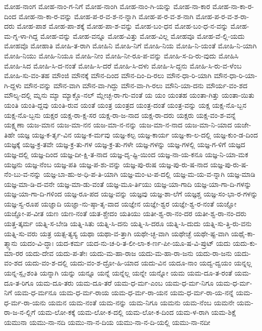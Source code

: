{ಮೋಹ-ನಾಂಗ
ಮೋಹ-ನಾಂ-ಗ-ನಿಗೆ
ಮೋಹ-ನಾಂಗಿ
ಮೋಹ-ನಾಂ-ಗಿ-ಯನ್ನು
ಮೋಹ-ನಾ-ಕಾರ
ಮೋಹ-ನಾ-ಕಾ-ರ-ದಿಂದ
ಮೋಹ-ನಾ-ಕಾ-ರ-ವನ್ನು
ಮೋಹ-ಪ-ರ-ವ-ಶ-ನ-ನ್ನಾಗಿ
ಮೋಹ-ಪ-ರ-ವ-ಶ-ನಾಗಿ
ಮೋಹ-ಪ-ರ-ವ-ಶ-ರಾ-ದರು
ಮೋಹ-ಪಾಶ
ಮೋಹ-ಪಾ-ಶಕ್ಕೆ
ಮೋಹ-ಪಾ-ಶ-ವನ್ನು
ಮೋಹ-ಬಂ-ಧನ
ಮೋಹ-ಬಂ-ಧ-ನ-ವನ್ನು
ಮೋಹ-ಮ-ಗ್ನ-ಳಾ-ಗಿದ್ದ
ಮೋಹ-ವನ್ನು
ಮೋಹ-ವನ್ನೂ
ಮೋಹ-ವಿತ್ತು
ಮೋಹ-ವಿಲ್ಲ
ಮೋಹವೂ
ಮೋಹ-ವೆ-ಲ್ಲಿ-ಯದು
ಮೋಹವೊ
ಮೋಹಾತಿ
ಮೋಹಿ-ತ-ರಾಗಿ
ಮೋಹಿನಿ
ಮೋಹಿ-ನಿಗೆ
ಮೋಹಿ-ನಿಯ
ಮೋಹಿ-ನಿ-ಯಂತೆ
ಮೋಹಿ-ನಿ-ಯಾಗಿ
ಮೋಹಿ-ನಿಯು
ಮೋಹಿ-ನಿಯೂ
ಮೋಹಿ-ನೀಂ
ಮೋಹಿ-ನೀ-ರೂ-ಪ-ವನ್ನು
ಮೋಹಿ-ಸ-ದಿ-ರು-ವುದು
ಮೋಹಿಸಿ
ಮೋಹಿ-ಸಿದ
ಮೋಹಿ-ಸಿ-ದ-ನಂತೆ
ಮೋಹಿ-ಸಿ-ದರೆ
ಮೋಹಿ-ಸಿ-ದಳು
ಮೋಹಿ-ಸಿ-ದ್ದನು
ಮೋಹಿ-ಸಿ-ರು-ವ-ಳೆಂಬ
ಮೋಹಿ-ಸು-ವಂ-ತಹ
ಮೌಂಜಿ
ಮೌನಕ್ಕೆ
ಮೌನ-ದಿಂದ
ಮೌನ-ದಿಂ-ದಿ-ರಲು
ಮೌನ-ಧಾ-ರಿ-ಯಾಗಿ
ಮೌನ-ಧಾ-ರಿ-ಯಾ-ಗಿ-ದ್ದಳು
ಮೌನ-ವನ್ನು
ಮೌನ-ವಾಗಿ
ಮೌನ-ವಾ-ಗಿದ್ದು
ಮೌನ-ವಾ-ಗಿ-ರಲು
ಮೌನಿ-ಯಾ-ದನು
ಮೌರ್ಯ-ವಂ-ಶದ
ಮೌಲ್ಯ-ದಲ್ಲಿ
ಮ್ನನು
ಮ್ಯಾ
ಮ್ಯಾಕ್ಡೊ-ನಲ್
ಮ್ಲೇಚ್ಛ-ರಾ-ಗು-ವಂತೆ
ಯ
ಯಂ
ಯಂತಹ
ಯಂತಾ-ಗಿತ್ತು
ಯಂತಾ-ಯಿತು
ಯಂತಿ
ಯಂತಿ-ದ್ದವು
ಯಂತಿ-ರುವ
ಯಂತೆ
ಯಂತ್ರ
ಯಂತ್ರದ
ಯಂತ್ರ-ದಂತೆ
ಯಂತ್ರ-ವನ್ನು
ಯಕ್ಷ
ಯಕ್ಷ-ನೊ-ಬ್ಬನ
ಯಕ್ಷ-ನೊ-ಬ್ಬನು
ಯಕ್ಷರ
ಯಕ್ಷ-ರಾ-ಕ್ಷ-ಸರ
ಯಕ್ಷ-ರಾ-ಜ-ನಾದ
ಯಕ್ಷ-ರಾ-ದರು
ಯಕ್ಷರು
ಯಕ್ಷ-ವಂ-ಶ-ವನ್ನೆ
ಯಕ್ಷ್ಮಣಾ
ಯಜ-ಮಾನ
ಯಜ-ಮಾ-ನನ
ಯಜ-ಮಾ-ನ-ನನ್ನು
ಯಜ-ಮಾ-ನ-ನಾದ
ಯಜ-ಮಾ-ನಿ-ಯಾದ
ಯಜೇ-ತಿಹೇ
ಯಜ್ಞ
ಯಜ್ಞ-ಕ-ರ್ತೃ-ವಿನ
ಯಜ್ಞ-ಕ-ರ್ಮವು
ಯಜ್ಞ-ಕಲ್ಪ
ಯಜ್ಞ-ಕಾರ್ಯ
ಯಜ್ಞ-ಕಾ-ಲ-ದಲ್ಲಿ
ಯಜ್ಞ-ಕುಂ-ಡ-ದಿಂದ
ಯಜ್ಞಕ್ಕೆ
ಯಜ್ಞ-ಕ್ರ-ತವೇ
ಯಜ್ಞ-ಕ್ರ-ತು-ಗಳ
ಯಜ್ಞ-ಕ್ರ-ತು-ಗಳೇ
ಯಜ್ಞ-ಗಳನ್ನು
ಯಜ್ಞ-ಗಳಲ್ಲಿ
ಯಜ್ಞ-ಗ-ಳಿಗೆ
ಯಜ್ಞದ
ಯಜ್ಞ-ದಲ್ಲಿ
ಯಜ್ಞ-ದಿಂದ
ಯಜ್ಞ-ದೀ-ಕ್ಷಿ-ತ-ನಾದ
ಯಜ್ಞ-ದೃ-ಷ್ಟಿ-ಯಿಂದ
ಯಜ್ಞ-ನಾ-ಯ-ಕನೂ
ಯಜ್ಞ-ನಿ-ಯಾ-ಮಕ
ಯಜ್ಞನು
ಯಜ್ಞ-ನೆಂಬ
ಯಜ್ಞ-ಪತಿ
ಯಜ್ಞ-ಪ-ಶು-ವನ್ನು
ಯಜ್ಞ-ಪು-ರುಷ
ಯಜ್ಞ-ಪು-ರು-ಷ-ನಾದ
ಯಜ್ಞ-ಪು-ರು-ಷ-ನೆಂ-ಬು-ವ-ನನ್ನು
ಯಜ್ಞ-ಬಾ-ಹು-ಅ-ಧಿ-ಪ-ತಿ-ಯಾಗಿ
ಯಜ್ಞ-ಮಂ-ಟ-ಪ-ದಲ್ಲಿ
ಯಜ್ಞ-ಮ-ಯ-ವ-ನ್ನಾಗಿ
ಯಜ್ಞ-ಮಾಡಿ
ಯಜ್ಞ-ಮಾ-ಡಿ-ದ-ವನೇ
ಯಜ್ಞ-ಮಾ-ಡು-ವಂತೆ
ಯಜ್ಞ-ಮೂ-ರ್ತಿಯು
ಯಜ್ಞ-ಯಾ-ಗಾದಿ
ಯಜ್ಞ-ಯಾ-ಗಾ-ದಿ-ಗಳನ್ನು
ಯಜ್ಞ-ಯಾ-ಗಾ-ದಿ-ಗಳಿಂದ
ಯಜ್ಞ-ರೂ-ಪದ
ಯಜ್ಞ-ವನ್ನು
ಯಜ್ಞವು
ಯಜ್ಞ-ಶಾ-ಲೆಗೆ
ಯಜ್ಞಶ್ಚ
ಯಜ್ಞ-ಸಂ-ಭಾ-ರ-ಗಳನ್ನು
ಯಜ್ಞ-ಸ್ವ-ರೂಪ
ಯಜ್ಞಾದಿ
ಯಜ್ಞಾ-ನು-ಷ್ಠಾ-ತೃ-ವಾದ
ಯಜ್ಞೇನ
ಯಜ್ಞೇ-ಶ್ವರ
ಯಜ್ಞೇ-ಶ್ವ-ರ-ನಂತೆ
ಯಜ್ಞೋ
ಯಜ್ಞೋ-ಪ-ವೀತ
ಯಣ
ಯಣ-ನಂತೆ
ಯತ-ಶ್ಚೇದಂ
ಯತಿಯು
ಯತೀ-ಶ್ವ-ರಾ-ನಂ-ದರ
ಯತೀ-ಶ್ವ-ರಾ-ನಂ-ದರು
ಯತ್ತ-ತ್ಕರ್ಮ
ಯತ್ನಿ-ಸ-ಬೇಡಿ
ಯತ್ನಿ-ಸಿತು
ಯತ್ನಿ-ಸಿ-ದನು
ಯತ್ನಿ-ಸಿ-ದರೂ
ಯತ್ನಿ-ಸಿ-ದುದು
ಯತ್ನಿ-ಸು-ತ್ತಿ-ರು-ವನು
ಯತ್ನಿ-ಸು-ವರು
ಯತ್ರ
ಯತ್ಸ-ತ್ಯಸ್ಯ
ಯಥಾ
ಯಥಾ-ವ-ತ್ತಾಗಿ
ಯಥೇ-ಚ್ಛ-ವಾಗಿ
ಯಥೇಚ್ಛೆ
ಯಥೇ-ಷ್ಟ-ವಾಗಿ
ಯಥೈ-ಕಾ-ತ್ಮ್ಯಾನು
ಯದಂ-ವಿ-ದ್ಧಾಃ
ಯದ-ಕರ್ಮ
ಯದ-ನು-ಚ-ರಿ-ತ-ಲೀ-ಲಾ-ಕ-ರ್ಣ-ಪೀ-ಯೂ-ಷ-ವಿ-ಪ್ರುಟ್
ಯದು
ಯದು-ಕು-ಮಾ-ರರ
ಯದು-ದೇವ
ಯದು-ಪ-ತೇಃ
ಯದು-ಮ-ಹಾ-ರಾಜ
ಯದು-ಮ-ಹಾ-ರಾ-ಜನು
ಯದು-ರಾ-ಜನು
ಯದು-ವಂ-ಶದ
ಯದು-ವಂ-ಶ-ದಲ್ಲಿ
ಯದು-ವಂ-ಶ-ದ್ರೋ-ಹಿ-ಯಾದ
ಯದು-ವಿನ
ಯದೂ-ನಾಂ
ಯದ್ವ-ದ್ವಯಂ
ಯನ್ನಲ್ಲ
ಯನ್ನ-ಸ್ಪೃ-ಶಂತಿ
ಯನ್ನಾಗಿ
ಯನ್ನು
ಯನ್ನೂ
ಯನ್ನೆ
ಯನ್ನೆಲ್ಲ
ಯನ್ನೇ
ಯನ್ನೋ
ಯಮ
ಯಮ-ದೂ-ತ-ರಂತೆ
ಯಮ-ದೂ-ತ-ರಿಗೂ
ಯಮ-ದೂ-ತರು
ಯಮ-ದೂ-ತರೆ
ಯಮ-ಧ-ರ್ಮ-ಎಂಬ
ಯಮ-ಧ-ರ್ಮ-ನಿಗೂ
ಯಮ-ಧ-ರ್ಮ-ನಿಗೆ
ಯಮ-ಧ-ರ್ಮನೂ
ಯಮ-ಧ-ರ್ಮ-ರಾಯ
ಯಮ-ಧ-ರ್ಮ-ರಾ-ಯನ
ಯಮ-ಧ-ರ್ಮ-ರಾ-ಯ-ನನ್ನೆ
ಯಮ-ಧ-ರ್ಮ-ರಾ-ಯನು
ಯಮನ
ಯಮ-ನಂತೆ
ಯಮ-ನನ್ನು
ಯಮ-ನಿಗೂ
ಯಮನು
ಯಮ-ನೆಂಬ
ಯಮನೇ
ಯಮ-ರಾ-ಜ-ನ-ಲ್ಲಿಗೆ
ಯಮ-ಲೋ-ಕಕ್ಕೆ
ಯಮ-ಲೋ-ಕ-ದಲ್ಲಿ
ಯಮ-ಲೋ-ಕ-ದಿಂದ
ಯಮ-ಳ-ರಾಗಿ
ಯಮ-ಶಿಕ್ಷೆ
ಯಮುನಾ
ಯಮು-ನಾ-ನದಿ
ಯಮು-ನಾ-ನ-ದಿಯ
ಯಮು-ನಾ-ನ-ದಿ-ಯಲ್ಲಿ
ಯಮು-ನಾ-ನದೀ
}
